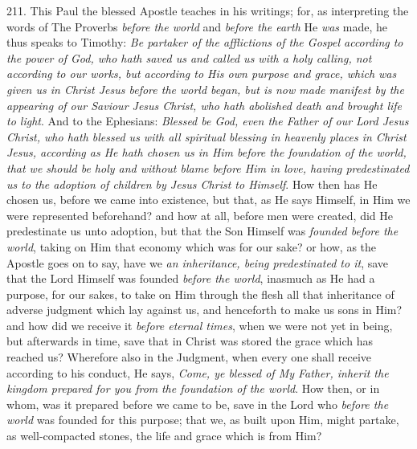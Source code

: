 211. This Paul the blessed
Apostle teaches in his writings; for, as interpreting the words of The
Proverbs \emph{before the world} and \emph{before the earth} He \emph{was}
made, he thus speaks to Timothy: \emph{Be partaker of the afflictions of
the Gospel according to the power of God, who hath saved us and called
us with a holy calling, not according to our works, but according to
His own purpose and grace, which was given us in Christ Jesus before
the world began, but is now made manifest by the appearing of our
Saviour Jesus Christ, who hath abolished death and brought life to
light}. And to the Ephesians: \emph{Blessed be God, even the Father of
our Lord Jesus Christ, who hath blessed us with all spiritual blessing
in heavenly places in Christ Jesus, according as He hath chosen us in
Him before the foundation of the world, that we should be holy and
without blame before Him in love, having predestinated us to the
adoption of children by Jesus Christ to Himself}. How then has He
chosen us, before we came into existence, but that, as He says
Himself, in Him we were represented beforehand? and how at all,
before men were created, did He predestinate us unto adoption, but
that the Son Himself was \emph{founded before the world}, taking on
Him that economy which was for our sake? or how, as the Apostle goes
on to say, have we \emph{an inheritance, being predestinated to it},
save that the Lord Himself was founded \emph{before the world},
inasmuch as He had a purpose, for our sakes, to take on Him through
the flesh all that inheritance of adverse judgment which lay against
us, and henceforth to make us sons in Him? and how did we receive
it \emph{before eternal times}, when we were not yet in being, but
afterwards in time, save that in Christ was stored the grace which has
reached us? Wherefore also in the Judgment, when every one shall
receive according to his conduct, He says, \emph{Come, ye blessed of My
Father, inherit the kingdom prepared for you from} \emph{the
foundation of the world}. How then, or in whom, was it prepared
before we came to be, save in the Lord who \emph{before the world} was
founded for this purpose; that we, as built upon Him, might partake,
as well-compacted stones, the life and grace which is from Him?


